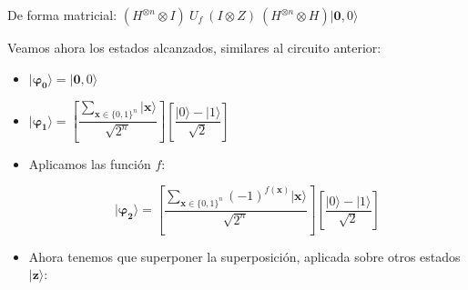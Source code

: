  \vspace{30pt}

 De forma matricial: $(H^{\otimes n} \otimes I)\: U_{f}\:(I\otimes Z)\:(H^{\otimes n} \otimes H) |\mathbf{0},0\rangle$ \newline

 Veamos ahora los estados alcanzados, similares al circuito anterior:

 \begin{itemize}
     \item $\mathbf{|\varphi_{0}\rangle} = |\mathbf{0},0\rangle$

    \vspace{5pt}

    \item  $\mathbf{|\varphi_{1}\rangle} = \left[ \dfrac{\sum_{\mathbf{x} \in \{0,1\}^{n}}|\mathbf{x}\rangle}{\sqrt{2^{n}}}\right] \left[ \dfrac{|0\rangle - |1\rangle}{\sqrt{2}}\right]$

    \vspace{5pt}

    \item Aplicamos las función $f$:
    
    \begin{equation} \label{eq:BV:phi2}
    \mathbf{|\varphi_{2}\rangle} =\left[ \dfrac{\sum_{\mathbf{x} \in \{0,1\}^{n}}(-1)^{f(\mathbf{x})}|\mathbf{x}\rangle}{\sqrt{2^{n}}}\right] \left[ \dfrac{|0\rangle - |1\rangle}{\sqrt{2}}\right]\end{equation}

    \vspace{5pt}

    \item Ahora tenemos que superponer la superposición, aplicada sobre otros estados $|\mathbf{z}\rangle$:


\end{itemize}
